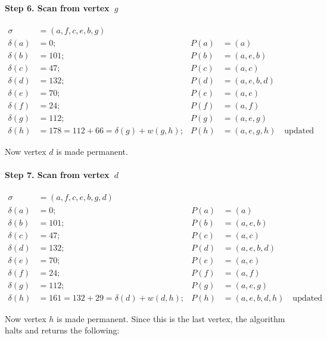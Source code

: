 \documentclass[10pt,]{book}
\theoremstyle{plain}
\theoremstyle{definition}
\theoremstyle{definition}
\theoremstyle{definition}
\theoremstyle{definition}
\numberwithin{equation}{section}
\newcommand{\amp}{&}
\begin{document}
\paragraph[{Step 6.  Scan from vertex~\(g\)}]{Step 6.  Scan from vertex~\(g\)}\hypertarget{paragraphs-6}{}
\hypertarget{p-218}{}%
%
\begin{align*}
\sigma\amp=(a,f,c,e,b,g)\\
\delta(a)\amp=0; \amp P(a)\amp=(a)\\
\delta(b)\amp=101; \amp P(b)\amp=(a,e,b)\\
\delta(c)\amp=47; \amp P(c)\amp=(a,c)\\
\delta(d)\amp= 132; \amp P(d)\amp=(a,e,b,d)\\
\delta(e)\amp=70; \amp P(e)\amp=(a,e)\\
\delta(f)\amp=24; \amp P(f)\amp=(a,f)\\
\delta(g)\amp=112; \amp P(g)\amp=(a,e,g)\\
\delta(h)\amp=178 = 112+66=\delta(g)+w(g,h); \amp P(h)\amp=(a,e,g,h)\quad\text{updated}
\end{align*}
%
\par
\hypertarget{p-219}{}%
Now vertex \(d\) is made permanent.%
\typeout{************************************************}
\typeout{************************************************}
\paragraph[{Step 7.  Scan from vertex~\(d\)}]{Step 7.  Scan from vertex~\(d\)}\hypertarget{paragraphs-7}{}
\hypertarget{p-220}{}%
%
\begin{align*}
\sigma\amp=(a,f,c,e,b,g,d)\\
\delta(a)\amp=0; \amp P(a)\amp=(a)\\
\delta(b)\amp=101; \amp P(b)\amp=(a,e,b)\\
\delta(c)\amp=47; \amp P(c)\amp=(a,c)\\
\delta(d)\amp= 132; \amp P(d)\amp=(a,e,b,d)\\
\delta(e)\amp=70; \amp P(e)\amp=(a,e)\\
\delta(f)\amp=24; \amp P(f)\amp=(a,f)\\
\delta(g)\amp=112; \amp P(g)\amp=(a,e,g)\\
\delta(h)\amp=161 = 132+29=\delta(d)+w(d,h); \amp P(h)\amp=(a,e,b,d,h)\quad\text{updated}
\end{align*}
%
\par
\hypertarget{p-221}{}%
Now vertex \(h\) is made permanent. Since this is the last vertex, the algorithm halts and returns the following:%
\typeout{************************************************}
\typeout{************************************************}
\end{document}
